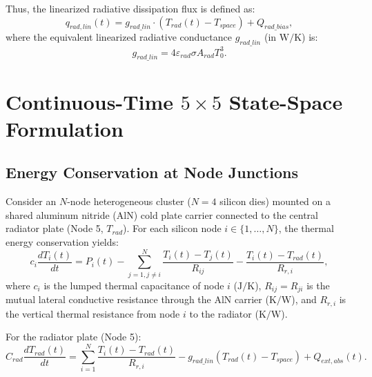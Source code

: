 \documentclass[11pt,a4paper]{article}
\begin{document}
Thus, the linearized radiative dissipation flux is defined as:
\begin{equation}
q_{rad, lin}(t) = g_{rad\_lin} \cdot (T_{rad}(t) - T_{space}) + Q_{rad\_bias},
\end{equation}
where the equivalent linearized radiative conductance $g_{rad\_lin}$ (in $\text{W/K}$) is:
\begin{equation}
g_{rad\_lin} = 4 \varepsilon_{rad} \sigma A_{rad} T_0^3.
\end{equation}

\section{Continuous-Time $5\times 5$ State-Space Formulation}

\subsection{Energy Conservation at Node Junctions}
Consider an $N$-node heterogeneous cluster ($N=4$ silicon dies) mounted on a shared aluminum nitride (AlN) cold plate carrier connected to the central radiator plate (Node 5, $T_{rad}$). For each silicon node $i \in \{1, \dots, N\}$, the thermal energy conservation yields:
\begin{equation}
c_i \frac{d T_i(t)}{dt} = P_i(t) - \sum_{j=1, j \ne i}^N \frac{T_i(t) - T_j(t)}{R_{ij}} - \frac{T_i(t) - T_{rad}(t)}{R_{r, i}},
\end{equation}
where $c_i$ is the lumped thermal capacitance of node $i$ ($\text{J/K}$), $R_{ij} = R_{ji}$ is the mutual lateral conductive resistance through the AlN carrier ($\text{K/W}$), and $R_{r, i}$ is the vertical thermal resistance from node $i$ to the radiator ($\text{K/W}$).

For the radiator plate (Node 5):
\begin{equation}
C_{rad} \frac{d T_{rad}(t)}{dt} = \sum_{i=1}^N \frac{T_i(t) - T_{rad}(t)}{R_{r, i}} - g_{rad\_lin} (T_{rad}(t) - T_{space}) + Q_{ext, abs}(t).
\end{equation}
\end{document}
